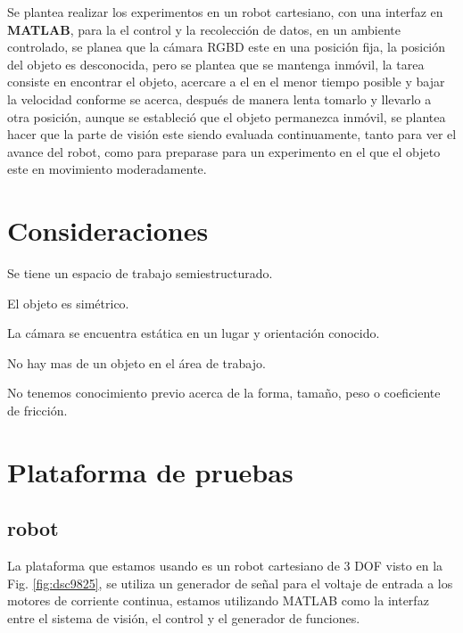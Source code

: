 Se plantea realizar los experimentos en un robot cartesiano, con una interfaz en \textbf{MATLAB}, para la el control y la recolección de datos, en un ambiente controlado, se planea que la cámara RGBD este en una posición fija, la posición del objeto es desconocida, pero se plantea que se mantenga inmóvil, la tarea consiste en encontrar el objeto, acercare a el en el menor tiempo posible y bajar la velocidad conforme se acerca, después de manera lenta tomarlo y llevarlo a otra posición, aunque se estableció que el objeto permanezca inmóvil, se plantea hacer que la parte de visión este siendo evaluada continuamente, tanto para ver el avance del robot, como para preparase para un experimento en el que el objeto este en movimiento moderadamente.



\section{Consideraciones}




\begin{prop}[consideraciones]
	\item  Se tiene un espacio de trabajo semiestructurado. \label{Assumtion:1}
	\item  El objeto es simétrico. \label{Assumtion:2} %
	\item  La cámara se encuentra estática en un lugar y orientación conocido. \label{Assumtion:3}
	\item  No hay mas de un objeto en el área de trabajo. \label{Assumtion:4}
	\item  No tenemos conocimiento previo acerca de la forma, tamaño, peso o coeficiente de fricción.\label{Assumtion:5}
\end{prop} 











\section{Plataforma de pruebas}

\subsection{robot}
La plataforma que estamos usando es un robot cartesiano de 3 DOF visto en la Fig. \ref{fig:dsc9825}, se utiliza un generador de señal para el voltaje de entrada a los motores de corriente continua, estamos utilizando MATLAB como la interfaz entre el sistema de visión, el control y el generador de funciones.

